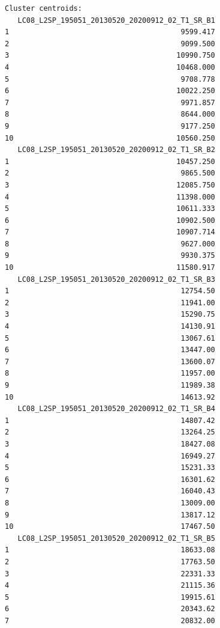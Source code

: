 \documentclass[knowledge,article,submit,pdftex,moreauthors]{Definitions/mdpi}
\begin{document}
\begin{small}
\begin{verbatim}
Cluster centroids:
   LC08_L2SP_195051_20130520_20200912_02_T1_SR_B1
1                                        9599.417
2                                        9099.500
3                                       10990.750
4                                       10468.000
5                                        9708.778
6                                       10022.250
7                                        9971.857
8                                        8644.000
9                                        9177.250
10                                      10560.250
   LC08_L2SP_195051_20130520_20200912_02_T1_SR_B2
1                                       10457.250
2                                        9865.500
3                                       12085.750
4                                       11398.000
5                                       10611.333
6                                       10902.500
7                                       10907.714
8                                        9627.000
9                                        9930.375
10                                      11580.917
   LC08_L2SP_195051_20130520_20200912_02_T1_SR_B3
1                                        12754.50
2                                        11941.00
3                                        15290.75
4                                        14130.91
5                                        13067.61
6                                        13447.00
7                                        13600.07
8                                        11957.00
9                                        11989.38
10                                       14613.92
   LC08_L2SP_195051_20130520_20200912_02_T1_SR_B4
1                                        14807.42
2                                        13264.25
3                                        18427.08
4                                        16949.27
5                                        15231.33
6                                        16301.62
7                                        16040.43
8                                        13009.00
9                                        13817.12
10                                       17467.50
   LC08_L2SP_195051_20130520_20200912_02_T1_SR_B5
1                                        18633.08
2                                        17763.50
3                                        22331.33
4                                        21115.36
5                                        19915.61
6                                        20343.62
7                                        20832.00

\end{verbatim}
\end{small}
\end{document}
